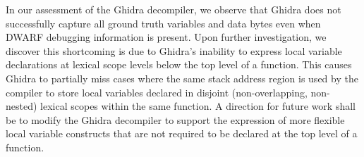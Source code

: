 \documentclass[a4paper,twoside]{article}
\begin{document}
In our assessment of the Ghidra decompiler, we observe that Ghidra does not successfully capture all ground truth variables and data bytes even when DWARF debugging information is present. Upon further investigation, we discover this shortcoming is due to Ghidra's inability to express local variable declarations at lexical scope levels below the top level of a function. This causes Ghidra to partially miss cases where the same stack address region is used by the compiler to store local variables declared in disjoint (non-overlapping, non-nested) lexical scopes within the same function. A direction for future work shall be to modify the Ghidra decompiler to support the expression of more flexible local variable constructs that are not required to be declared at the top level of a function.

\nocite{*}



% 
% 
% 


% 

% 
% 
% 
% 
% 
% 


% 

% 
% 
% 
% 
% 
% 
\end{document}
